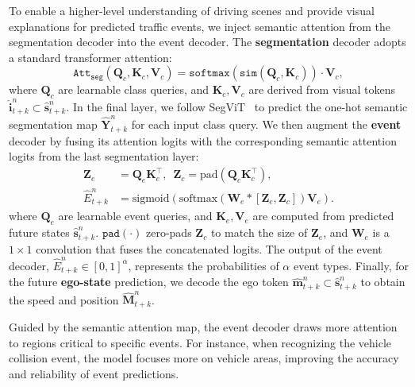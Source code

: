 \documentclass[twocolumn]{template}
\theoremstyle{thmstyleone}%
\theoremstyle{thmstyletwo}%
\theoremstyle{thmstylethree}%
\begin{document}
To enable a higher-level understanding of driving scenes and provide visual explanations for predicted traffic events,
we inject semantic attention from the segmentation decoder into the event decoder.
The \textbf{segmentation} decoder adopts a standard transformer attention:
\begin{equation}
\!\!\mathtt{Att_{seg}}(\!\mathbf{Q}_c,\!\mathbf{K}_c,\!\!\mathbf{V}_c\!) \!=\! \mathtt{softmax}(\mathtt{sim}(\mathbf{Q}_c,\mathbf{K}_c))\!\cdot\!\!\mathbf{V}_c,
\end{equation}
where $\mathbf{Q}_c$ are learnable class queries, and $\mathbf{K}_c,\mathbf{V}_c$ are derived from visual tokens $\hat{\mathbf{i}}^{n}_{t+k}\subset \hat{\mathbf{s}}^{n}_{t+k}$.
In the final layer, we follow SegViT~\cite{SegViT} to predict the one-hot semantic segmentation map $\hat{\mathbf{Y}}^{n}_{t+k}$ for each input class query.
We then augment the \textbf{event} decoder by fusing its attention logits with the corresponding semantic attention logits from the last segmentation layer:
\begin{equation}
\begin{aligned}
\mathbf{Z}_e &= \mathbf{Q}_e \mathbf{K}_e^\top, \,\,\,\mathbf{Z}_c = \mathrm{pad}(\mathbf{Q}_c \mathbf{K}_c^\top), \\
\hat{E}^{n}_{t+k}
&= \mathrm{sigmoid}\!\left(
    \mathrm{softmax}\!\left(
        \mathbf{W}_e * [\mathbf{Z}_e, \mathbf{Z}_c]
    \right) \!\mathbf{V}_e
   \right).
\end{aligned}    
\end{equation}
where $\mathbf{Q}_e$ are learnable event queries,
and $\mathbf{K}_e,\mathbf{V}_e$ are computed from predicted future states $\hat{\mathbf{s}}^{n}_{t+k}$.
$\mathtt{pad}(\cdot)$ zero-pads $\mathbf{Z}_c$ to match the size of $\mathbf{Z}_e$,
and $\mathbf{W}_e$ is a $1\times1$ convolution that fuses the concatenated logits.
The output of the event decoder, $\hat{E}^{n}_{t+k}\in[0,1]^\alpha$, represents the probabilities of $\alpha$ event types.
Finally, for the future \textbf{ego-state} prediction, we decode the ego token $\hat{\mathbf{m}}^{n}_{t+k}\subset \hat{\mathbf{s}}^{n}_{t+k}$ to obtain the speed and position $\hat{\mathbf{M}}^{n}_{t+k}$.

Guided by the semantic attention map, the event decoder draws more attention to regions critical to specific events.
For instance, when recognizing the vehicle collision event,
the model focuses more on vehicle areas, improving the accuracy and reliability of event predictions.
\end{document}
